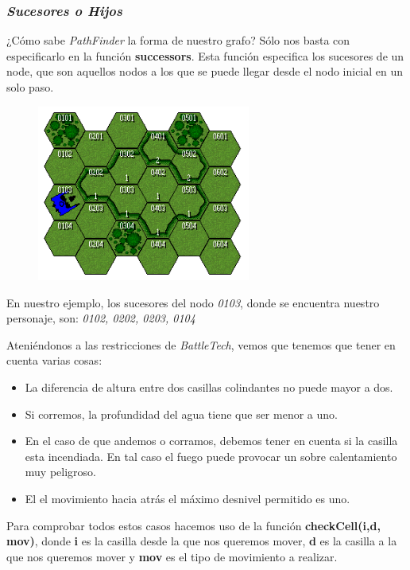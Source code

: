 \documentclass[a4paper,12pt,oneside]{book}
\begin{document}
\subsubsection{{\it \bf Sucesores o Hijos}}

¿Cómo sabe {\it PathFinder} la forma de nuestro grafo? Sólo nos basta
con especificarlo en la función {\bf successors}. Esta función
especifica los sucesores de un node, que son aquellos nodos a los que
se puede llegar desde el nodo inicial en un solo paso. 

\begin{figure}[!h]
  \centering
  \includegraphics[width=7cm]{images/map2.png}
\end{figure}

En nuestro ejemplo, los sucesores del nodo {\it 0103}, donde se encuentra
nuestro personaje, son: {\it 0102, 0202, 0203, 0104}

Ateniéndonos a las restricciones de {\it BattleTech}, vemos que
tenemos que tener en cuenta varias cosas:

\begin{itemize}
\item La diferencia de altura entre dos casillas colindantes no puede
  mayor a dos.
\item Si corremos, la profundidad del agua tiene que ser menor a uno.
\item En el caso de que andemos o corramos, debemos tener en cuenta si
  la casilla esta incendiada. En tal caso el fuego puede provocar un
  sobre calentamiento muy peligroso.
\item El el movimiento hacia atrás el máximo desnivel permitido es uno.
\end{itemize}

Para comprobar todos estos casos hacemos uso de la función {\bf
  checkCell(i,d, mov)}, donde {\bf i} es la casilla desde la que nos
queremos mover, {\bf d} es la casilla a la que nos queremos mover y {\bf mov} es
el tipo de movimiento a realizar.
\end{document}
